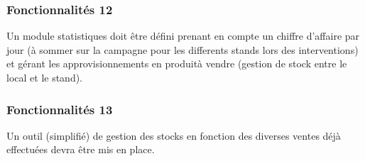 \subsubsection{Fonctionnalités 12}
Un module statistiques doit être défini prenant en compte un chiffre d'affaire par jour (à sommer sur la campagne pour les differents stands lors des interventions) et gérant les approvisionnements en produità vendre (gestion de stock entre le local et le stand).
\\

\subsubsection{Fonctionnalités 13}
Un outil (simplifié) de gestion des stocks en fonction des diverses ventes déjà effectuées devra être mis en place.
\\
